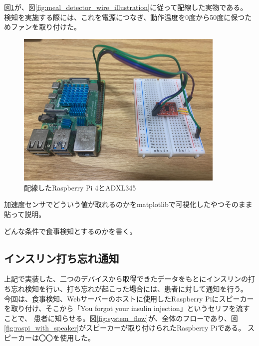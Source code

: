 図\ref{fig:meal_detector}が、図\ref{fig:meal_detector_wire_illustration}に従って配線した実物である。
検知を実施する際には、これを電源につなぎ、動作温度を0度から50度に保つためファンを取り付けた。\cite{raspi_4_heat} \cite{raspi_4_spec}

\begin{figure}[htbp]
  \caption{配線したRaspberry Pi 4とADXL345}
  \label{fig:meal_detector}
  \begin{center}
    \includegraphics[bb=0 0 1300 1100,width=10cm]{assets/meal_detector.jpg}
  \end{center}
\end{figure}

加速度センサでどういう値が取れるのかをmatplotlibで可視化したやつそのまま貼って説明。

どんな条件で食事検知とするのかを書く。

\subsection{インスリン打ち忘れ通知}

上記で実装した、二つのデバイスから取得できたデータをもとにインスリンの打ち忘れ検知を行い、打ち忘れが起こった場合には、患者に対して通知を行う。
今回は、食事検知、Webサーバーのホストに使用したRaspberry Piにスピーカーを取り付け、そこから「You forgot your insulin injection」というセリフを流すことで、
患者に知らせる。図\ref{fig:system_flow}が、全体のフローであり、図\ref{fig:raspi_with_speaker}がスピーカーが取り付けられたRaspberry Piである。
スピーカーは〇〇を使用した。


